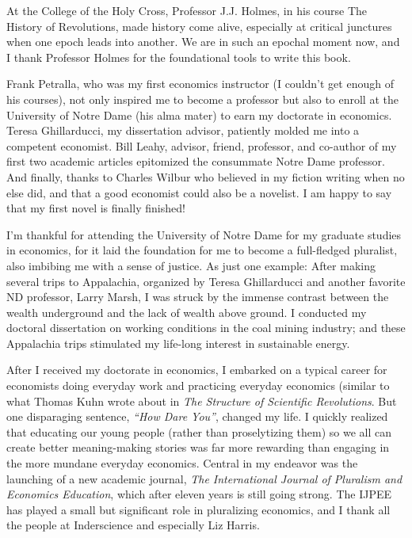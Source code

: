 At the College of the Holy Cross, Professor J.J. Holmes, in his course The History of Revolutions, made history come alive, especially at critical junctures when one epoch leads into another. We are in such an epochal moment now, and I thank Professor Holmes for the foundational tools to write this book. 


Frank Petralla, who was my first economics instructor (I couldn’t get enough of his courses), not only inspired me to become a professor but also to enroll at the University of Notre Dame (his alma mater) to earn my doctorate in economics. Teresa Ghillarducci, my dissertation advisor, patiently molded me into a competent economist. Bill Leahy, advisor, friend, professor, and co-author of my first two academic articles epitomized the consummate Notre Dame professor.  And finally, thanks to Charles Wilbur who believed in my fiction writing when no else did, and that a good economist could also be a novelist. I am happy to say that my first novel is finally finished! 


I’m thankful for attending the University of Notre Dame for my graduate studies in economics, for it laid the foundation for me to become a full-fledged pluralist, also imbibing me with a sense of justice. As just one example: After making several trips to Appalachia, organized by Teresa Ghillarducci and another favorite ND professor, Larry Marsh, I was struck by the immense contrast between the wealth underground and the lack of wealth above ground. I conducted my doctoral dissertation on working conditions in the coal mining industry; and these Appalachia trips stimulated my life-long interest in sustainable energy.  


After I received my doctorate in economics, I embarked on a typical career for economists doing everyday work and practicing everyday economics (similar to what Thomas Kuhn wrote about in \emph{The Structure of Scientific Revolutions}.  But one disparaging sentence, \emph{“How Dare You”}, changed my life. I quickly realized that educating our young people (rather than proselytizing them) so we all can create better meaning-making stories was far more rewarding than engaging in the more mundane everyday economics. Central in my endeavor was the launching of a new academic journal,  \emph{The International  Journal of Pluralism and Economics Education}, which after eleven years is still going strong. The IJPEE has played a small but significant role in  pluralizing economics, and I thank all the people at Inderscience and especially Liz Harris.



